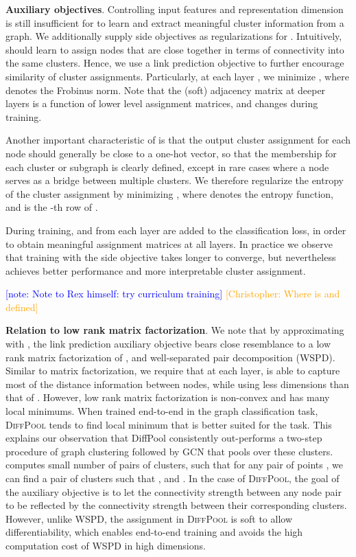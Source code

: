 \documentclass{article}
\newcommand{\note}[1]{{{\textcolor{blue}{[note: #1]}}}}
\newcommand{\chris}[1]{{{\textcolor{orange}{[Christopher: #1]}}}}
\newcommand{\xhdr}[1]{{\noindent\bfseries #1}.}
\newcommand{\name}{\textsc{DiffPool}\xspace}
\begin{document}
{\xhdr{Auxiliary objectives}
Controlling input features and representation dimension is still insufficient for  to learn and extract meaningful cluster information from a graph. We additionally supply side objectives as regularizations for . 
Intuitively,  should learn to assign nodes that are close together in terms of connectivity into the same clusters. 
Hence, we use a link prediction objective to further encourage similarity of cluster assignments.
Particularly, at each layer , we minimize
, where  denotes the Frobinus norm. 
Note that the (soft) adjacency matrix  at deeper layers is a function of lower level assignment matrices, and changes during training. 

Another important characteristic of  is that the output cluster assignment for each node should generally be close to a one-hot vector, so that the membership for each cluster or subgraph is clearly defined, except in rare cases where a node serves as a bridge between multiple clusters. We therefore regularize the entropy of the cluster assignment by minimizing , where  denotes the entropy function, and  is the -th row of .

During training,  and  from each layer are added to the classification loss, in order to obtain meaningful assignment matrices at all layers. In practice we observe that training with the side objective takes longer to converge, but nevertheless achieves better performance and more interpretable cluster assignment.

\note{Note to Rex himself: try curriculum training}
\chris{Where is  and  defined}

\xhdr{Relation to low rank matrix factorization}
We note that by approximating  with , the link prediction auxiliary objective bears close resemblance to a low rank matrix factorization of , and well-separated pair decomposition (WSPD). 
Similar to matrix factorization, we require that at each layer,  is able to capture most of the distance information between nodes, while using less dimensions than that of . However, low rank matrix factorization is non-convex and has many local minimums. When trained end-to-end in the graph classification task, \name tends to find local minimum that is better suited for the task. This explains our observation that DiffPool consistently out-performs a two-step procedure of graph clustering followed by GCN that pools over these clusters.
 computes small number of pairs of clusters, such that for any pair of points , we can find a pair of clusters  such that , and . In the case of \name, the goal of the auxiliary objective is to let the connectivity strength between any node pair  to be reflected by the connectivity strength between their corresponding clusters. However, unlike WSPD, the assignment in \name is soft to allow differentiability, which enables end-to-end training and avoids the high computation cost of WSPD in high dimensions.


}
\end{document}
